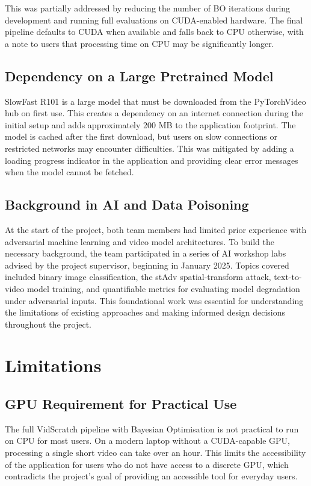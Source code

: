 This was partially addressed by reducing the number of
BO iterations during development and running full
evaluations on CUDA-enabled hardware. The final
pipeline defaults to CUDA when available and falls
back to CPU otherwise, with a note to users that
processing time on CPU may be significantly longer.

\subsection{Dependency on a Large Pretrained Model}

SlowFast R101 is a large model that must be downloaded
from the PyTorchVideo hub on first use. This creates
a dependency on an internet connection during the
initial setup and adds approximately 200 MB to the
application footprint. The model is cached after the
first download, but users on slow connections or
restricted networks may encounter difficulties. This
was mitigated by adding a loading progress indicator
in the application and providing clear error messages
when the model cannot be fetched.

\subsection{Background in AI and Data Poisoning}

At the start of the project, both team members had
limited prior experience with adversarial machine
learning and video model architectures. To build the
necessary background, the team participated in a
series of AI workshop labs advised by the project
supervisor, beginning in January 2025. Topics covered
included binary image classification, the stAdv
spatial-transform attack, text-to-video model training,
and quantifiable metrics for evaluating model
degradation under adversarial inputs. This foundational
work was essential for understanding the limitations of
existing approaches and making informed design decisions
throughout the project.

\section{Limitations}
\label{section:limitations}

\subsection{GPU Requirement for Practical Use}

The full VidScratch pipeline with Bayesian Optimisation
is not practical to run on CPU for most users. On a
modern laptop without a CUDA-capable GPU, processing
a single short video can take over an hour. This
limits the accessibility of the application for
users who do not have access to a discrete GPU,
which contradicts the project's goal of providing an
accessible tool for everyday users.


